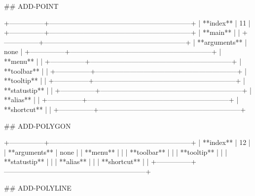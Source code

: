 ## ADD-POINT

+---------------+--------------------------------------------------------------+
| **index**     | 11                                                           |
+---------------+--------------------------------------------------------------+
| **main**      |                                                              |
+---------------+--------------------------------------------------------------+
| **arguments** | none                                                         |
+---------------+--------------------------------------------------------------+
| **menu**      |                                                              |
+---------------+--------------------------------------------------------------+
| **toolbar**   |                                                              |
+---------------+--------------------------------------------------------------+
| **tooltip**   |                                                              |
+---------------+--------------------------------------------------------------+
| **statustip** |                                                              |
+---------------+--------------------------------------------------------------+
| **alias**     |                                                              |
+---------------+--------------------------------------------------------------+
| **shortcut**  |                                                              |
+---------------+--------------------------------------------------------------+

## ADD-POLYGON

+---------------+--------------------------------------------------------------+
| **index**     | 12                                                           |
| **arguments** | none                                                         |
| **menu**      |                                                              |
| **toolbar**   |                                                              |
| **tooltip**   |                                                              |
| **statustip** |                                                              |
| **alias**     |                                                              |
| **shortcut**  |                                                              |
+---------------+--------------------------------------------------------------+


## ADD-POLYLINE

